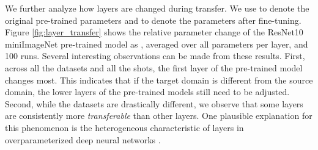 \documentclass[runningheads]{llncs}
\begin{document}
We further analyze how layers are changed during transfer. We use  to denote the original pre-trained parameters and  to denote the parameters after fine-tuning. Figure \ref{fig:layer_transfer} shows the relative parameter change of the ResNet10 miniImageNet pre-trained model as , averaged over all parameters per layer, and 100 runs. Several interesting observations can be made from these results. First, across all the datasets and all the shots, the first layer of the pre-trained model changes most. This indicates that if the target domain is different from the source domain, the lower layers of the pre-trained models still need to be adjusted. Second, while the datasets are drastically different, we observe that some layers are consistently more \textit{transferable} than other layers. One plausible explanation for this phenomenon is the heterogeneous characteristic of layers in overparameterized deep neural networks \cite{zhang2019all}.


\begin{table*}[t]
\centering
{}
\end{table*}
\begin{table*}[t]
\centering
{}
\caption{The results of using all embeddings, and the  \textit{Incremental Multi-model Selection} (IMS-f) based on fine-tuned pre-trained models on the proposed benchmark.}
\label{tab:ims}
\end{table*}
\end{document}
